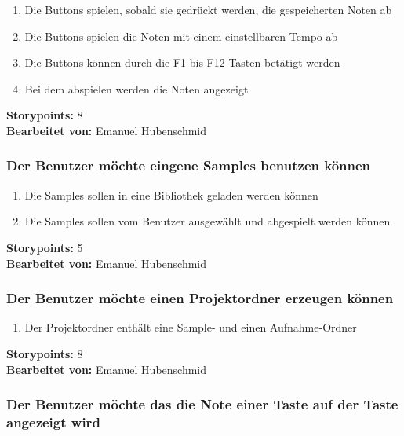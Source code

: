 \begin{enumerate}
 \item Die Buttons spielen, sobald sie gedrückt werden, die gespeicherten Noten ab
 \item Die Buttons spielen die Noten mit einem einstellbaren Tempo ab
 \item Die Buttons können durch die F1 bis F12 Tasten betätigt werden
 \item Bei dem abspielen werden die Noten angezeigt
\end{enumerate}

\textbf{Storypoints:} 8 \\
\textbf{Bearbeitet von: } Emanuel Hubenschmid \\


\subsubsection{Der Benutzer möchte eingene Samples benutzen können}

\begin{enumerate}
 \item Die Samples sollen in eine Bibliothek geladen werden können
 \item Die Samples sollen vom Benutzer ausgewählt und abgespielt werden können
\end{enumerate}

\textbf{Storypoints:} 5 \\
\textbf{Bearbeitet von: } Emanuel Hubenschmid \\


\subsubsection{Der Benutzer möchte einen Projektordner erzeugen können}

\begin{enumerate}
 \item Der Projektordner enthält eine Sample- und einen Aufnahme-Ordner
\end{enumerate}

\textbf{Storypoints:} 8 \\
\textbf{Bearbeitet von: } Emanuel Hubenschmid \\


\subsubsection{Der Benutzer möchte das die Note einer Taste auf der Taste angezeigt wird}

